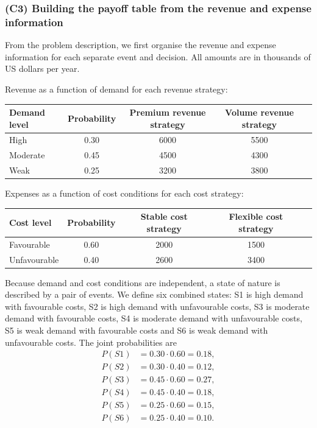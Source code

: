 \subsubsection{(C3) Building the payoff table from the revenue and expense information}\label{subsubsec:example3-c3}

From the problem description, we first organise the revenue and expense information for each separate event and decision.
All amounts are in thousands of US dollars per year.

\medskip
\noindent Revenue as a function of demand for each revenue strategy:
\begin{table}[h!]
	\centering
	\begin{tabular}{@{}lcccc@{}}
		\toprule
		Demand level & Probability & Premium revenue strategy & Volume revenue strategy \\
		\midrule
		High & 0.30 & 6000 & 5500 \\
		Moderate & 0.45 & 4500 & 4300 \\
		Weak & 0.25 & 3200 & 3800 \\
		\bottomrule
	\end{tabular}
\end{table}

\medskip
\noindent Expenses as a function of cost conditions for each cost strategy:
\begin{table}[h!]
	\centering
	\begin{tabular}{@{}lcccc@{}}
		\toprule
		Cost level & Probability & Stable cost strategy & Flexible cost strategy \\
		\midrule
		Favourable & 0.60 & 2000 & 1500 \\
		Unfavourable & 0.40 & 2600 & 3400 \\
		\bottomrule
	\end{tabular}
\end{table}

Because demand and cost conditions are independent, a state of nature is described by a pair of events. We define six
combined states: S1 is high demand with favourable costs, S2 is high demand with unfavourable costs, S3 is moderate demand
with favourable costs, S4 is moderate demand with unfavourable costs, S5 is weak demand with favourable costs and S6 is
weak demand with unfavourable costs. The joint probabilities are
\[
\begin{aligned}
P(S1) &= 0.30 \cdot 0.60 = 0.18,\\
P(S2) &= 0.30 \cdot 0.40 = 0.12,\\
P(S3) &= 0.45 \cdot 0.60 = 0.27,\\
P(S4) &= 0.45 \cdot 0.40 = 0.18,\\
P(S5) &= 0.25 \cdot 0.60 = 0.15,\\
P(S6) &= 0.25 \cdot 0.40 = 0.10.
\end{aligned}
\]

